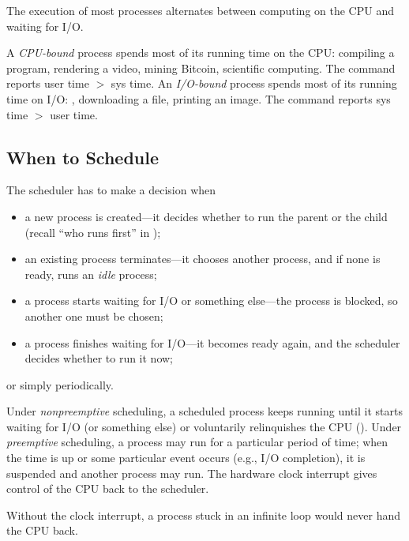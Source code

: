 The execution of most processes alternates between computing on the CPU and waiting for I/O.

\begin{definition}
  A \emph{CPU-bound} process spends most of its running time on the CPU: compiling a program, rendering a video, mining Bitcoin, scientific computing. The  command reports user time $>$ sys time. An \emph{I/O-bound} process spends most of its running time on I/O: , downloading a file, printing an image. The  command reports sys time $>$ user time.
\end{definition}

\subsection{When to Schedule}

The scheduler has to make a decision when
\begin{itemize}
  \item a new process is created---it decides whether to run the parent or the child (recall ``who runs first'' in );
  \item an existing process terminates---it chooses another process, and if none is ready, runs an \emph{idle} process;
  \item a process starts waiting for I/O or something else---the process is blocked, so another one must be chosen;
  \item a process finishes waiting for I/O---it becomes ready again, and the scheduler decides whether to run it now;
\end{itemize}
or simply periodically.

\begin{definition}
  Under \emph{nonpreemptive} scheduling, a scheduled process keeps running until it starts waiting for I/O (or something else) or voluntarily relinquishes the CPU (). Under \emph{preemptive} scheduling, a process may run for a particular period of time; when the time is up or some particular event occurs (e.g., I/O completion), it is suspended and another process may run. The hardware clock interrupt gives control of the CPU back to the scheduler.
\end{definition}

Without the clock interrupt, a process stuck in an infinite loop would never hand the CPU back.

